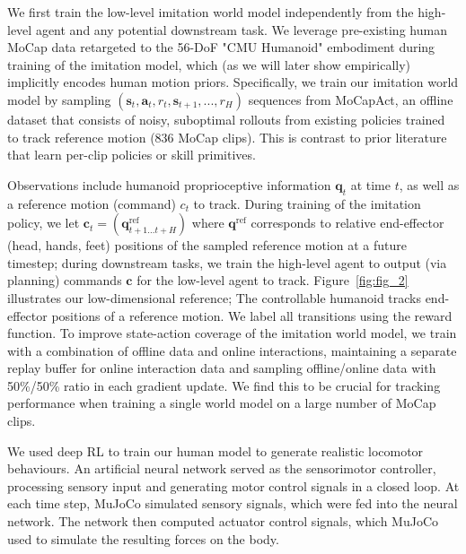 \documentclass[sn-mathphys-num]{sn-jnl}%
\theoremstyle{thmstyleone}	%
\theoremstyle{thmstyletwo}	%
\theoremstyle{thmstylethree}	%
\begin{document}
We first train the low-level imitation world model independently from the high-level agent and any potential downstream task.
We leverage pre-existing human MoCap data retargeted to the 56-DoF "CMU Humanoid" embodiment during training of the imitation model, which (as we will later show empirically) implicitly encodes human motion priors.
Specifically, we train our imitation world model by sampling $ (\mathbf{s}_t, \mathbf{a}_t, r_t, \mathbf{s}_{t+1}, ..., r_H) $ sequences from MoCapAct, an offline dataset that consists of noisy, suboptimal rollouts from existing policies trained to track reference motion (836 MoCap clips).
This is contrast to prior literature that learn per-clip policies or skill primitives.


Observations include humanoid proprioceptive information $ \mathbf{q}_t $ at time $ t $, as well as a reference motion (command) $ c_t $ to track.
During training of the imitation policy, we let $ \mathbf{c}_t = (\mathbf{q}_{t+1...t+H}^\text{ref}) $ where $ \mathbf{q}^\text{ref} $ corresponds to relative end-effector (head, hands, feet) positions of the sampled reference motion at a future timestep;
during downstream tasks, we train the high-level agent to output (via planning) commands $ \mathbf{c} $ for the low-level agent to track.
Figure~\ref{fig:fig_2} illustrates our low-dimensional reference; 
The controllable humanoid tracks end-effector positions of a reference motion.
We label all transitions using the reward function.
To improve state-action coverage of the imitation world model, we train with a combination of offline data and online interactions, maintaining a separate replay buffer for online interaction data and sampling offline/online data with 50\%/50\% ratio in each gradient update.
We find this to be crucial for tracking performance when training a single world model on a large number of MoCap clips.



We used deep RL to train our human model to generate realistic locomotor behaviours.
An artificial neural network served as the sensorimotor controller, processing sensory input and generating motor control signals in a closed loop. 
At each time step, MuJoCo simulated sensory signals, which were fed into the neural network. 
The network then computed actuator control signals, which MuJoCo used to simulate the resulting forces on the body.
\end{document}

